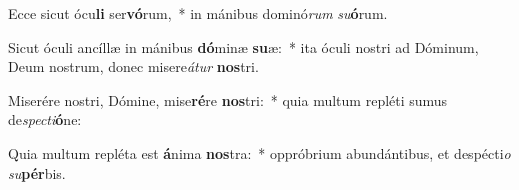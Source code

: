 \item Ecce sicut ócu\textbf{li} ser\textbf{vó}rum,~* in mánibus dominó\textit{rum} \textit{su}\textbf{ó}rum.
\item Sicut óculi ancíllæ in mánibus \textbf{dó}minæ \textbf{su}æ:~* ita óculi nostri ad Dóminum, Deum nostrum, donec misere\textit{á}\textit{tur} \textbf{nos}tri.
\item Miserére nostri, Dómine, mise\textbf{ré}re \textbf{nos}tri:~* quia multum repléti sumus de\textit{spec}\textit{ti}\textbf{ó}ne:
\item Quia multum repléta est \textbf{á}nima \textbf{nos}tra:~* oppróbrium abundántibus, et despécti\textit{o} \textit{su}\textbf{pér}bis.

